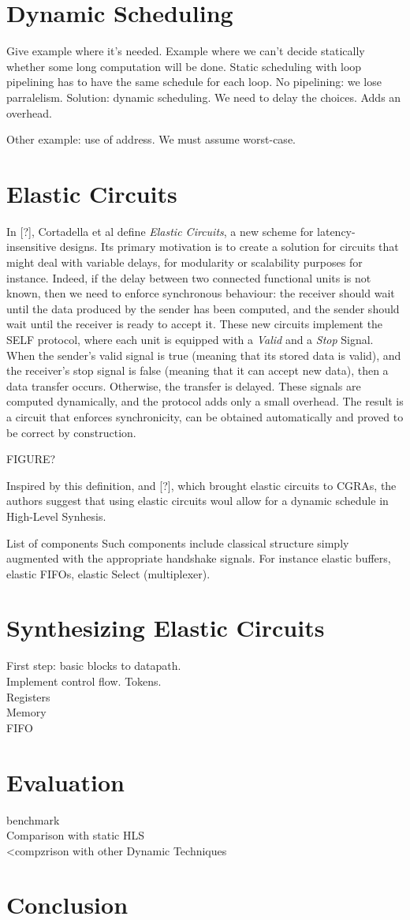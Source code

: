 \documentclass{article}
\def\todo#1{{\color{red}#1}}
\begin{document}
\section{Dynamic Scheduling}
\todo{Give example where it's needed.}
Example where we can't decide statically whether some long computation will be done.
Static scheduling with loop pipelining has to have the same schedule for each loop.
No pipelining: we lose parralelism.
Solution: dynamic scheduling. We need to delay the choices. Adds an overhead.

Other example: use of address. We must assume worst-case.

\section{Elastic Circuits}

In [?], Cortadella et al define \textit{Elastic Circuits}, a new scheme for latency-insensitive designs.
Its primary motivation is to create a solution for circuits that might deal with variable delays, for modularity or scalability purposes for instance.
Indeed, if the delay between two connected functional units is not known, then we need to enforce synchronous behaviour: the receiver should wait until the data produced by the sender has been computed, and the sender should wait until the receiver is ready to accept it.
These new circuits implement the SELF protocol, where each unit is equipped with a \textit{Valid} and a \textit{Stop} Signal. When the sender's valid signal is true (meaning that its stored data is valid), and the receiver's stop signal is false (meaning that it can accept new data), then a data transfer occurs. Otherwise, the transfer is delayed. These signals are computed dynamically, and the protocol adds only a small overhead. The result is a circuit that enforces synchronicity, can be obtained automatically and proved to be correct by construction.

FIGURE?

Inspired by this definition, and [?], which brought elastic circuits to CGRAs, the authors suggest that using elastic circuits woul allow for a dynamic schedule in High-Level Synhesis.

\todo{List of components}
Such components include classical structure simply augmented with the appropriate handshake signals. For instance elastic buffers, elastic FIFOs, elastic Select (multiplexer).



\section{Synthesizing Elastic Circuits}

First step: basic blocks to datapath.\\
Implement control flow. Tokens.\\
Registers\\
Memory\\
FIFO

\section{Evaluation}
benchmark\\
Comparison with static HLS\\
<compzrison with other Dynamic Techniques

\section{Conclusion}
\end{document}
